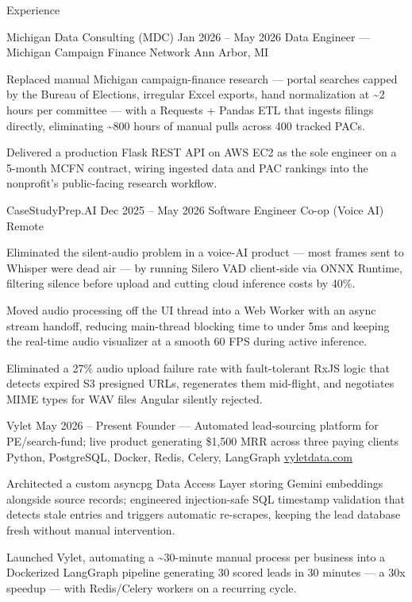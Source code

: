 \documentclass[
	11pt
]{../../../template}
\begin{document}
	\begin{rSection}{E}{xperience}
		\begin{rSectionEntry}
			{Michigan Data Consulting (MDC)}
			{Jan 2026 -- May 2026}
			{Data Engineer --- Michigan Campaign Finance Network}
			{}
			{Ann Arbor, MI}

			\item Replaced manual Michigan campaign-finance research — portal searches capped by the Bureau of Elections, irregular Excel exports, hand normalization at \textasciitilde{}2 hours per committee — with a Requests + Pandas ETL that ingests filings directly, eliminating \textasciitilde{}800 hours of manual pulls across 400 tracked PACs.
			\item Delivered a production Flask REST API on AWS EC2 as the sole engineer on a 5-month MCFN contract, wiring ingested data and PAC rankings into the nonprofit's public-facing research workflow.
		\end{rSectionEntry}

		\begin{rSectionEntry}
			{CaseStudyPrep.AI}
			{Dec 2025 -- May 2026}
			{Software Engineer Co-op (Voice AI)}
			{}
			{Remote}

			\item Eliminated the silent-audio problem in a voice-AI product — most frames sent to Whisper were dead air — by running Silero VAD client-side via ONNX Runtime, filtering silence before upload and cutting cloud inference costs by 40\%.
			\item Moved audio processing off the UI thread into a Web Worker with an async stream handoff, reducing main-thread blocking time to under 5ms and keeping the real-time audio visualizer at a smooth 60 FPS during active inference.
			\item Eliminated a 27\% audio upload failure rate with fault-tolerant RxJS logic that detects expired S3 presigned URLs, regenerates them mid-flight, and negotiates MIME types for WAV files Angular silently rejected.
		\end{rSectionEntry}

		\begin{rSectionEntry}
			{Vylet}
			{May 2026 -- Present}
			{Founder --- Automated lead-sourcing platform for PE/search-fund; live product generating \$1,500 MRR across three paying clients}
			{Python, PostgreSQL, Docker, Redis, Celery, LangGraph}
			{\href{https://vyletdata.com}{vyletdata.com}}

			\item Architected a custom asyncpg Data Access Layer storing Gemini embeddings alongside source records; engineered injection-safe SQL timestamp validation that detects stale entries and triggers automatic re-scrapes, keeping the lead database fresh without manual intervention.
			\item Launched Vylet, automating a \textasciitilde{}30-minute manual process per business into a Dockerized LangGraph pipeline generating 30 scored leads in 30 minutes --- a 30x speedup --- with Redis/Celery workers on a recurring cycle.
		\end{rSectionEntry}
	\end{rSection}
\end{document}
